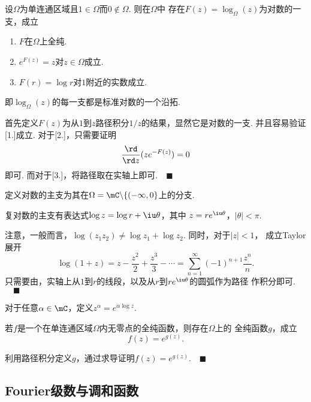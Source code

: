   \begin{thm}
    设$\Omega$为单连通区域且$1\in\Omega$而$0\notin\Omega$. 则在$\Omega$中
    存在$F(z)=\log_{\Omega}(z)$为对数的一支，成立
    \begin{enumerate}
      \item $F$在$\Omega$上全纯.
      \item $e^{F(z)}=z$对$z\in\Omega$成立.
      \item $F(r)=\log r$对$1$附近的实数成立.
    \end{enumerate}
    即$\log_\Omega(z)$的每一支都是标准对数的一个沿拓.
  \end{thm}
  \proof
    首先定义$F(z)$为从$1$到$z$路径积分$1/z$的结果，显然它是对数的一支. 并且容易验证
    [1.]成立. 对于[2.]，只需要证明
    \[
      \frac{\rd}{\rd z}(ze^{-F(z)}) = 0
    \]
    即可. 而对于[3.]，将路径取在实轴上即可.$\quad\blacksquare$

  \begin{defi}[主支]
    定义对数的主支为其在$\Omega = \mC\backslash\{(-\infty, 0\}$上的分支.
  \end{defi}

  \begin{thm}
    复对数的主支有表达式$\log z = \log r + \iu\theta$，其中
    $z=re^{\iu\theta}$，$|\theta|<\pi$.
  \end{thm}
  \remark
    注意，一般而言，$\log(z_1z_2)\ne \log z_1 + \log z_2$. 同时，对于$|z|<1$，
    成立Taylor展开
    \[
      \log(1+z) = z-\frac{z^2}{2}+\frac{z^3}{3} - \cdots = 
      \sum_{n=1}^\infty (-1)^{n+1}\frac{z^n}{n}.
    \]
  \proof
    只需要由，实轴上从$1$到$r$的线段，以及从$r$到$re^{\iu\theta}$的圆弧作为路径
    作积分即可.$\quad\blacksquare$

  \begin{defi}[指数]
    对于任意$\alpha\in\mC$，定义$z^\alpha = e^{\alpha\log z}$.
  \end{defi}

  \begin{thm}
    若$f$是一个在单连通区域$\Omega$内无零点的全纯函数，则存在$\Omega$上的
    全纯函数$g$，成立
    \[
      f(z) = e^{g(z)}.
    \]
  \end{thm}
  \proof
    利用路径积分定义$g$，通过求导证明$f(z)=e^{g(z)}$.$\quad\blacksquare$




\subsection{Fourier级数与调和函数}


